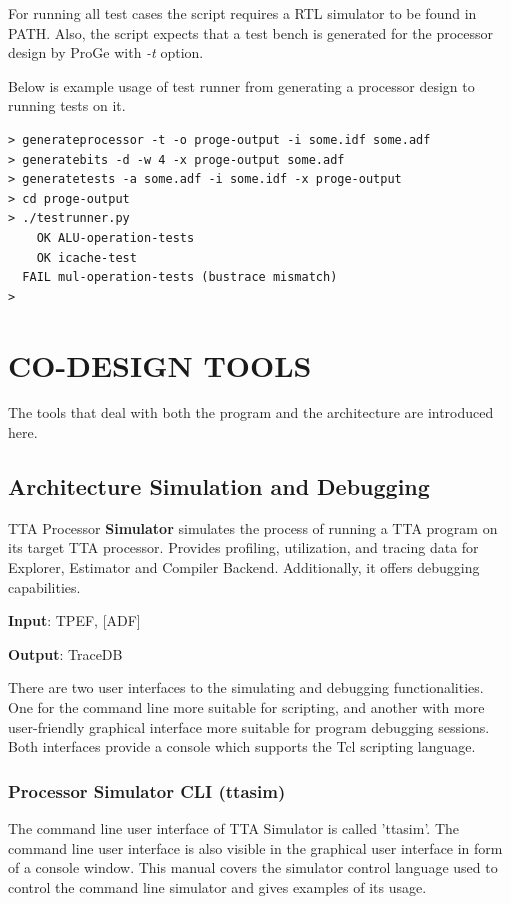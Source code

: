 \documentclass[a4paper,twoside]{tceusermanual}
\begin{document}
For running all test cases the script requires a RTL simulator to be
found in PATH. Also, the script expects that a test bench is generated
for the processor design by ProGe with \textit{-t} option.

Below is example usage of test runner from generating a processor
design to running tests on it.

\begin{verbatim}
> generateprocessor -t -o proge-output -i some.idf some.adf
> generatebits -d -w 4 -x proge-output some.adf
> generatetests -a some.adf -i some.idf -x proge-output
> cd proge-output
> ./testrunner.py
    OK ALU-operation-tests
    OK icache-test
  FAIL mul-operation-tests (bustrace mismatch)
>
\end{verbatim}


\chapter{CO-DESIGN TOOLS}
\label{section:codesign}

The tools that deal with both the program and the architecture are
introduced here.


\section{Architecture Simulation and Debugging}

TTA Processor \textbf{Simulator} simulates the process of running a TTA
program on its target TTA processor. Provides profiling, utilization, and 
tracing data for Explorer, Estimator and Compiler Backend.  Additionally, 
it offers debugging capabilities. 

\textbf{Input}: TPEF, [ADF]

\textbf{Output}: TraceDB

There are two user interfaces to the simulating and debugging
functionalities. One for the command line more suitable for scripting, and
another with more user-friendly graphical interface more suitable for
program debugging sessions. Both interfaces provide a console which
supports the Tcl scripting language.

\subsection{Processor Simulator CLI (ttasim)}
\label{section:ttasim}

The command line user interface of TTA Simulator is called 'ttasim'. The command
line user interface is also visible in the graphical user interface in form of a
console window. This manual covers the simulator control language used to
control the command line simulator and gives examples of its usage.
\end{document}
